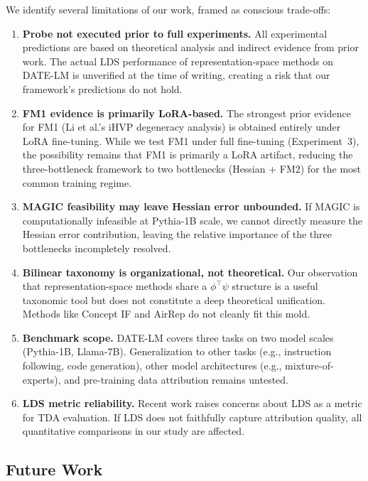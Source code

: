 \documentclass{article}
\begin{document}
We identify several limitations of our work, framed as conscious trade-offs:

\begin{enumerate}
    \item \textbf{Probe not executed prior to full experiments.} All experimental predictions are based on theoretical analysis and indirect evidence from prior work. The actual LDS performance of representation-space methods on DATE-LM is unverified at the time of writing, creating a risk that our framework's predictions do not hold.

    \item \textbf{FM1 evidence is primarily LoRA-based.} The strongest prior evidence for FM1 (Li et al.'s iHVP degeneracy analysis) is obtained entirely under LoRA fine-tuning. While we test FM1 under full fine-tuning (Experiment~3), the possibility remains that FM1 is primarily a LoRA artifact, reducing the three-bottleneck framework to two bottlenecks (Hessian + FM2) for the most common training regime.

    \item \textbf{MAGIC feasibility may leave Hessian error unbounded.} If MAGIC is computationally infeasible at Pythia-1B scale, we cannot directly measure the Hessian error contribution, leaving the relative importance of the three bottlenecks incompletely resolved.

    \item \textbf{Bilinear taxonomy is organizational, not theoretical.} Our observation that representation-space methods share a $\phi^\top \psi$ structure is a useful taxonomic tool but does not constitute a deep theoretical unification. Methods like Concept IF and AirRep do not cleanly fit this mold.

    \item \textbf{Benchmark scope.} DATE-LM covers three tasks on two model scales (Pythia-1B, Llama-7B). Generalization to other tasks (e.g., instruction following, code generation), other model architectures (e.g., mixture-of-experts), and pre-training data attribution remains untested.

    \item \textbf{LDS metric reliability.} Recent work raises concerns about LDS as a metric for TDA evaluation. If LDS does not faithfully capture attribution quality, all quantitative comparisons in our study are affected.
\end{enumerate}

\subsection{Future Work}
\end{document}
